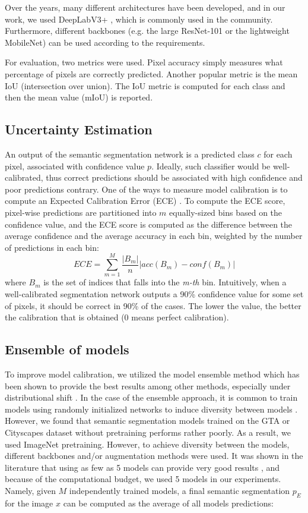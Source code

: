 \documentclass[conference]{IEEEtran}
\begin{document}
Over the years, many different architectures have been developed, and in our work, we used DeepLabV3+ \cite{deeplab}, which is commonly used in the community. Furthermore, different backbones (e.g. the large ResNet-101 or the lightweight MobileNet) can be used according to the requirements. 

For evaluation, two metrics were used. Pixel accuracy simply measures what percentage of pixels are correctly predicted. Another popular metric is the mean IoU (intersection over union). The IoU metric is computed for each class and then the mean value (mIoU) is reported.

\subsection{Uncertainty Estimation}
An output of the semantic segmentation network is a predicted class $c$ for each pixel, associated with confidence value $p$. Ideally, such classifier would be well-calibrated, thus correct predictions should be associated with high confidence and poor predictions contrary. One of the ways to measure model calibration is to compute an Expected Calibration Error (ECE) \cite{calibration}. To compute the ECE score, pixel-wise predictions are partitioned into $m$ equally-sized bins based on the confidence value, and the ECE score is computed as the difference between the average confidence and the average accuracy in each bin, weighted by the number of predictions in each bin:
\begin{equation}
ECE = \sum_{m=1}^M \frac{|B_m|}{n}|acc(B_m) - conf(B_m)|
\end{equation}
where $B_m$ is the set of indices that falls into the \textit{m-th} bin. Intuitively, when a well-calibrated segmentation network outputs a 90\% confidence value for some set of pixels, it should be correct in 90\% of the cases. The lower the value, the better the calibration that is obtained (0 means perfect calibration). 

\subsection{Ensemble of models}
To improve model calibration, we utilized the model ensemble method which has been shown to provide the best results among other methods, especially under distributional shift \cite{trustuncertainty}. In the case of the ensemble approach, it is common to train models using randomly initialized networks to induce diversity between models \cite{ensembles_1990}. However, we found that semantic segmentation models trained on the GTA or Cityscapes dataset without pretraining performs rather poorly. As a result, we used ImageNet pretraining. However, to achieve diversity between the models, different backbones and/or augmentation methods were used. It was shown in the literature that using as few as 5 models can provide very good results \cite{trustuncertainty}, and because of the computational budget, we used 5 models in our experiments. Namely, given $M$ independently trained models, a final semantic segmentation $p_E$ for the image $x$ can be computed as the average of all models predictions:
\end{document}
